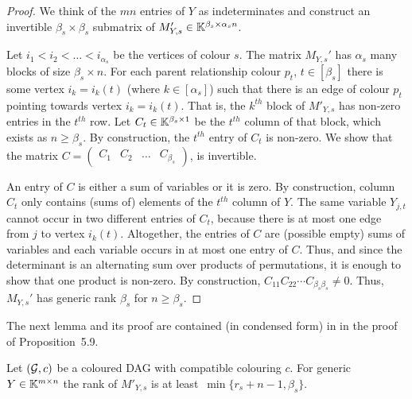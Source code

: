 
\begin{proof}
	We think of the $mn$ entries of $Y$ as indeterminates and construct an invertible $\beta_s \times \beta_s$ submatrix of $M'_{Y,s} \in \mathbb K^{\beta_s \times \alpha_s n}$.
	
	Let $i_1 < i_2 < \ldots < i_{\alpha_s}$ be the vertices of colour $s$. The matrix $M_{Y,s}'$ has $\alpha_s$ many blocks of size $\beta_s \times n$. For each parent relationship colour $p_t$, $t \in [\beta_s]$ there is some vertex $i_k = i_k(t)$ (where $k \in [\alpha_s]$) such that there is an edge of colour $p_t$ pointing towards vertex $i_k = i_k(t)$. That is, the $k^{th}$ block of $M'_{Y,s}$ has non-zero entries in the $t^{th}$ row. Let $C_t \in \mathbb K^{\beta_s \times 1}$ be the $t^{th}$ column of that block, which exists as $n \geq \beta_s$. By construction, the $t^{th}$ entry of $C_t$ is non-zero. We show that the matrix $C = \begin{pmatrix} C_{1} & C_2 & \ldots & C_{\beta_s}\end{pmatrix}$, is invertible.
	
	An entry of $C$ is either a sum of variables or it is zero. By construction, column $C_t$ only contains (sums of) elements of the $t^{th}$ column of $Y$. The same variable $Y_{j,t}$ cannot occur in two different entries of $C_t$, because there is at most one edge from $j$ to vertex $i_k(t)$. Altogether, the entries of $C$ are (possible empty) sums of variables and each variable occurs in at most one entry of $C$. Thus, and since the determinant is an alternating sum over products of permutations, it is enough to show that one product is non-zero.
	By construction,  $C_{11} C_{22} \cdots C_{\beta_s \beta_s} \neq 0$. Thus, $M_{Y,s}'$ has generic rank $\beta_s$ for $n \geq \beta_s$.
\end{proof}

The next lemma and its proof are contained (in condensed form) in \cite{RDAG} in the proof of Proposition~5.9.

\begin{lemma}\label{lem:M'YsStepsToFullRowRank}
	Let $(\mathcal{G}, c)$ be a coloured DAG with compatible colouring $c$. For generic $Y \in \mathbb K^{m \times n}$ the rank of $M'_{Y,s}$ is at least $\, \min \{ r_s + n -1 , \beta_s \}$.
\end{lemma}

